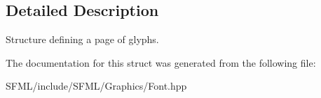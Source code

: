 \subsection{Detailed Description}
Structure defining a page of glyphs. 

\begin{DoxyVerb}\end{DoxyVerb}
 

The documentation for this struct was generated from the following file\+:\begin{DoxyCompactItemize}
\item 
S\+F\+M\+L/include/\+S\+F\+M\+L/\+Graphics/Font.\+hpp\end{DoxyCompactItemize}
